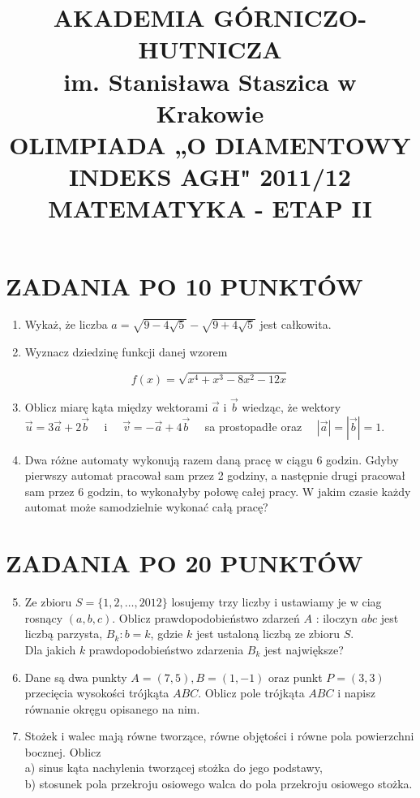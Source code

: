 \documentclass[10pt]{article}
\title{AKADEMIA GÓRNICZO-HUTNICZA \\
 im. Stanisława Staszica w Krakowie \\
 OLIMPIADA „O DIAMENTOWY INDEKS AGH" 2011/12 \\
 MATEMATYKA - ETAP II }
\author{}
\date{}
\begin{document}
\maketitle
\section*{ZADANIA PO 10 PUNKTÓW}
\begin{enumerate}
  \item Wykaż, że liczba $a=\sqrt{9-4 \sqrt{5}}-\sqrt{9+4 \sqrt{5}}$ jest całkowita.
  \item Wyznacz dziedzinę funkcji danej wzorem
\end{enumerate}

$$
f(x)=\sqrt{x^{4}+x^{3}-8 x^{2}-12 x}
$$

\begin{enumerate}
  \setcounter{enumi}{2}
  \item Oblicz miarę kąta między wektorami $\vec{a}$ i $\vec{b}$ wiedząc, że wektory $\vec{u}=3 \vec{a}+2 \vec{b} \quad$ i $\quad \vec{v}=-\vec{a}+4 \vec{b} \quad$ sa prostopadłe oraz $\quad|\vec{a}|=|\vec{b}|=1$.
  \item Dwa różne automaty wykonują razem daną pracę w ciągu 6 godzin. Gdyby pierwszy automat pracował sam przez 2 godziny, a następnie drugi pracował sam przez 6 godzin, to wykonałyby połowę całej pracy. W jakim czasie każdy automat może samodzielnie wykonać całą pracę?
\end{enumerate}

\section*{ZADANIA PO 20 PUNKTÓW}
\begin{enumerate}
  \setcounter{enumi}{4}
  \item Ze zbioru $S=\{1,2, \ldots, 2012\}$ losujemy trzy liczby i ustawiamy je w ciag rosnący $(a, b, c)$. Oblicz prawdopodobieństwo zdarzeń $A$ : iloczyn $a b c$ jest liczbą parzysta, $B_{k}: b=k$, gdzie $k$ jest ustaloną liczbą ze zbioru $S$.\\
Dla jakich $k$ prawdopodobieństwo zdarzenia $B_{k}$ jest największe?
  \item Dane są dwa punkty $A=(7,5), B=(1,-1)$ oraz punkt $P=(3,3)$ przecięcia wysokości trójkąta $A B C$. Oblicz pole trójkąta $A B C$ i napisz równanie okręgu opisanego na nim.
  \item Stożek i walec mają równe tworzące, równe objętości i równe pola powierzchni bocznej. Oblicz\\
a) sinus kąta nachylenia tworzącej stożka do jego podstawy,\\
b) stosunek pola przekroju osiowego walca do pola przekroju osiowego stożka.
\end{enumerate}
\end{document}
